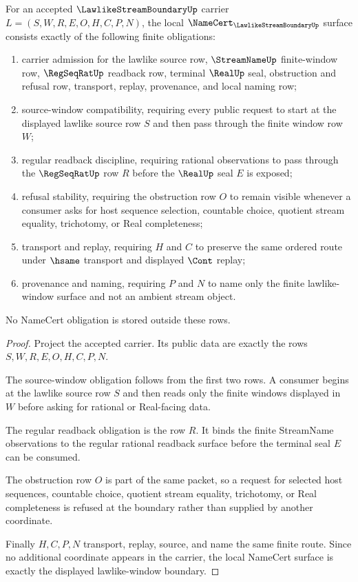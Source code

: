 \begin{theorem}
\label{thm:lawlike-stream-boundary-namecert-obligations}
For an accepted $\LawlikeStreamBoundaryUp$ carrier $L=(S,W,R,E,O,H,C,P,N)$, the local $\NameCert_{\LawlikeStreamBoundaryUp}$ surface consists exactly of the following finite obligations:
\begin{enumerate}
\item carrier admission for the lawlike source row, $\StreamNameUp$ finite-window row, $\RegSeqRatUp$ readback row, terminal $\RealUp$ seal, obstruction and refusal row, transport, replay, provenance, and local naming row;
\item source-window compatibility, requiring every public request to start at the displayed lawlike source row $S$ and then pass through the finite window row $W$;
\item regular readback discipline, requiring rational observations to pass through the $\RegSeqRatUp$ row $R$ before the $\RealUp$ seal $E$ is exposed;
\item refusal stability, requiring the obstruction row $O$ to remain visible whenever a consumer asks for host sequence selection, countable choice, quotient stream equality, trichotomy, or Real completeness;
\item transport and replay, requiring $H$ and $C$ to preserve the same ordered route under $\hsame$ transport and displayed $\Cont$ replay;
\item provenance and naming, requiring $P$ and $N$ to name only the finite lawlike-window surface and not an ambient stream object.
\end{enumerate}
No NameCert obligation is stored outside these rows.
\end{theorem}
\begin{proof}
Project the accepted carrier. Its public data are exactly the rows $S,W,R,E,O,H,C,P,N$.

The source-window obligation follows from the first two rows. A consumer begins at the lawlike source row $S$ and then reads only the finite windows displayed in $W$ before asking for rational or Real-facing data.

The regular readback obligation is the row $R$. It binds the finite StreamName observations to the regular rational readback surface before the terminal seal $E$ can be consumed.

The obstruction row $O$ is part of the same packet, so a request for selected host sequences, countable choice, quotient stream equality, trichotomy, or Real completeness is refused at the boundary rather than supplied by another coordinate.

Finally $H,C,P,N$ transport, replay, source, and name the same finite route. Since no additional coordinate appears in the carrier, the local NameCert surface is exactly the displayed lawlike-window boundary.
\end{proof}

